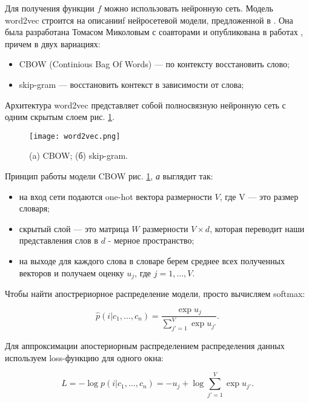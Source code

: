 \bigskip
Для получения функции $f$ можно использовать нейронную сеть. Модель word2vec строится на описанииf
нейросетевой модели, предложенной в \cite{Bengio}. Она была разработана Томасом Миколовым с соавторами и
опубликована в работах \cite{Mikolov:1, Mikolov:2}, причем в двух вариациях:

\bigskip
\begin{itemize}
 \item CBOW (Continious Bag Of Words) --- по контексту восстановить слово;
 \item skip-gram --- восстановить контекст в зависимости от слова;
\end{itemize}

\bigskip
Архитектура word2vec представляет собой полносвязную нейронную сеть с одним скрытым слоем рис.
\ref{fig:word2vec}.

\begin{figure}[ht]
    \centering
    \texttt{[image: word2vec.png]}
    \caption{(a) CBOW; (б) skip-gram.}
    \label{fig:word2vec}
\end{figure}

Принцип работы модели CBOW рис. \ref{fig:word2vec}, \textit{а}  выглядит так:

\bigskip
\begin{itemize}
 \item на вход сети подаются one-hot вектора размерности $V$, где V --- это размер словаря;
 \item скрытый слой --- это матрица $W$ размерности $V\times d$, которая переводит наши представления слов в
$d$ - мерное пространство;
 \item на выходе для каждого слова в словаре берем среднее всех полученных векторов и получаем оценку $u_j$,
где $j = 1, \ldots, V$.
\end{itemize}

\bigskip
Чтобы найти апострериорное распределение модели, просто вычисляем softmax:

\begin{equation}
 \hat{p}(i|c_1, \ldots, c_n) = \frac{\exp{u_j}}{\sum_{j'=1}^V \exp{u_{j'}}}.
\end{equation}

Для аппроксимации апостериорным распределением распределения данных используем loss-функцию для одного окна:

\begin{equation}
 L = -\log{p(i|c_1, \ldots, c_n)} = - u_j + \log{\sum_{j'=1}^{V} \exp{u_{j'}}}.
\end{equation}

